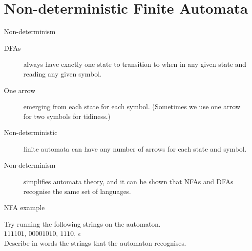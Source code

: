 \documentclass{beamer}
\begin{document}
\section{Non-deterministic Finite Automata}


\begin{frame}{Non-determinism}
  \begin{description}
    \item[DFAs] always have exactly one state to transition to when in any given state and reading any given symbol.
    \vspace{4mm}
    \item[One arrow] emerging from each state for each symbol. (Sometimes we use one arrow for two symbols for tidiness.)
    \vspace{4mm}
    \item[Non-deterministic] finite automata can have any number of arrows for each state and symbol.
    \vspace{4mm}
    \item[Non-determinism] simplifies automata theory, and it can be shown that NFAs and DFAs recognise the same set of languages.
  \end{description}
\end{frame}


\begin{frame}[fragile]{NFA example}
  \begin{center}
  \end{center}
  \begin{center}
    Try running the following strings on the automaton. \\
    $111101$, $00001010$, $1110$, $\epsilon$ \\
    Describe in words the strings that the automaton recognises.
  \end{center}
\end{frame}
\end{document}
